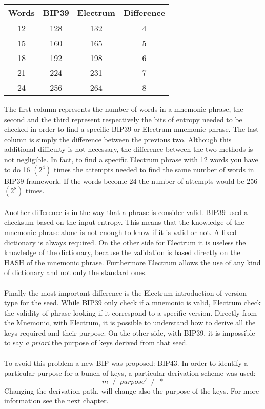 \begin{center}
	\begin{tabular}{|| c | c | c | c ||} 
		\hline
		Words & BIP39 & Electrum & Difference \\ [0.5ex] 
		\hline\hline
		12 & 128 & 132 & 4 \\ 
		
		15 & 160 & 165 & 5 \\
		
		18 & 192 & 198 & 6 \\
		
		21 & 224 & 231 & 7 \\
		
		24 & 256 & 264 & 8 \\ 
		\hline
	\end{tabular}
\end{center}
The first column represents the number of words in a mnemonic phrase, the second and the third represent respectively the bits of entropy needed to be checked in order to find a specific BIP39 or Electrum mnemonic phrase. The last column is simply the difference between the previous two. Although this additional difficulty is not necessary, the difference between the two methods is not negligible. In fact, to find a specific Electrum phrase with 12 words you have to do 16 $(2^4)$ times the attempts needed to find the same number of words in BIP39 framework. If the words become 24 the number of attempts would be 256 $(2^8)$ times.
\\ \\ 
Another difference is in the way that a phrase is consider valid. BIP39 used a checksum based on the input entropy. This means that the knowledge of the mnemonic phrase alone is not enough to know if it is valid or not. A fixed dictionary is always required. On the other side for Electrum it is useless the knowledge of the dictionary, because the validation is based directly on the HASH of the mnemonic phrase. Furthermore Electrum allows the use of any kind of dictionary and not only the standard ones.
\\ \\
Finally the most important difference is the Electrum introduction of version type for the seed. While BIP39 only check if a mnemonic is valid, Electrum check the validity of phrase looking if it correspond to a specific version. Directly from the Mnemonic, with Electrum, it is possible to understand how to derive all the keys required and their purpose. On the other side, with BIP39, it is impossible to say \textit{a priori} the purpose of keys derived from that seed. 
\\ \\
To avoid this problem a new BIP was proposed: BIP43. In order to identify a particular purpose for a bunch of keys, a particular derivation scheme was used:
\begin{equation*}
m\; \;/\;\; purpose'\;\; /\;\; *
\end{equation*}
Changing the derivation path, will change also the purpose of the keys. For more information see the next chapter.









